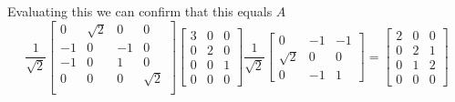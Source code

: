 \documentclass{article}
\begin{document}
Evaluating this we can confirm that this equals $A$
$$
\frac{1}{\sqrt{2}}
\begin{bmatrix}
0 & \sqrt{2} & 0 & 0\\
-1 & 0 & -1 & 0\\
-1 & 0 & 1 & 0\\
0 & 0 & 0 & \sqrt{2}\\
\end{bmatrix}
\begin{bmatrix}
3 & 0 & 0 \\
0 & 2 & 0 \\
0 & 0 & 1 \\
0 & 0 & 0
\end{bmatrix}
\frac{1}{\sqrt{2}}
\begin{bmatrix}
0 & -1 & -1 \\
\sqrt{2} & 0 & 0 \\
0 & -1 & 1
\end{bmatrix}
=
\begin{bmatrix}
2 & 0 & 0 \\
0 & 2 & 1 \\
0 & 1 & 2 \\
0 & 0 & 0
\end{bmatrix}
$$
\end{document}
